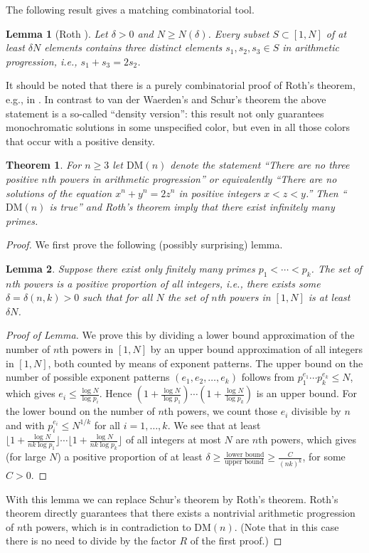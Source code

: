 \documentclass[12pt]{article}
\theoremstyle{theorem}
\newtheorem{theorem}{Theorem}
\newtheorem{lemma}{Lemma}
\theoremstyle{definition}
\newcommand{\DM}{\mathrm{DM}}
\begin{document}
The following result gives a matching combinatorial tool.
\begin{lemma}[Roth \cite{Roth}]
Let $\delta>0$ and $N\geq N(\delta)$.
 Every subset $ S\subset[1,N]$ of at least $\delta N$ elements contains
three distinct elements $s_1,s_2,s_3\in S$ in arithmetic progression, 
i.e., $s_1+s_3=2s_2$.
\end{lemma}
It should be noted that there is a purely combinatorial proof of Roth's theorem,
e.g., in \cite[pp. 46--49]{Graham-Rothschild-Spencer}. 
In contrast to van der Waerden's and
Schur's theorem the above statement
is a so-called ``density version'': this result not only guarantees
monochromatic solutions in some unspecified color, but even in all those 
colors that occur with a positive density.
\begin{theorem}
For $n \geq 3$ let $\DM(n)$ denote the statement
``There are no three positive $n$th powers in arithmetic progression''
or equivalently 
``There are no solutions of the equation 
$x^n+y^n=2z^n$ in positive integers $x<z<y$.''
Then ``$\DM(n)$ is true'' and Roth's theorem imply that
there exist infinitely many primes.
\end{theorem}

\begin{proof}
We first prove the following (possibly surprising) lemma.
\begin{lemma}{\label{positive-density}}
 Suppose there exist only finitely many primes $p_1< \cdots < p_k$.
The set of $n$th powers is a positive proportion of all
integers, i.e., there exists some $\delta=\delta(n,k) >0$ such that for all $N$
the set of $n$th powers in $[1,N]$ is at least $\delta N$.
\end{lemma}
\begin{proof}[Proof of Lemma]
We prove this by
dividing a lower bound approximation of the number of $n$th powers in $[1,N]$
by an upper
bound approximation of all integers in $[1,N]$, both counted by means of
exponent patterns.
The upper bound
on the number of possible exponent patterns $(e_1, e_2, \ldots ,e_k)$ follows
from $p_1^{e_1} \cdots p_k^{e_k}\leq N$, which gives $e_i \leq \frac{\log
  N}{\log p_i}$. Hence 
$(1+\frac{\log N}{\log p_1}) \cdots (1+\frac{\log N}{\log p_k})$ 
is an upper bound.
For the lower bound on the number of $n$th powers, we 
count those $e_i$ divisible by $n$ and with 
$p_i^{e_i}\leq N^{1/k}$ for all $i=1, \ldots ,k$. We see that
at least $\lfloor 1+ \frac{\log N}{nk\log p_1}\rfloor 
\cdots \lfloor 1+\frac{\log N}{nk\log p_k}\rfloor $ of all integers at most $N$
are $n$th powers, 
which gives (for large $N$) a positive proportion of at least
$\delta\geq \frac{\textrm{ lower bound}}{\textrm{upper bound}}\geq
\frac{C}{(nk)^k}$, for some $C>0$.
\end{proof}
With this lemma we can replace Schur's theorem by Roth's theorem.
Roth's theorem directly guarantees 
that there exists a nontrivial arithmetic progression of $n$th
powers, 
which is in contradiction to $\DM(n)$. 
(Note that in this case there is no need to divide by 
the factor $R$ of the first proof.)
\end{proof}
\end{document}
